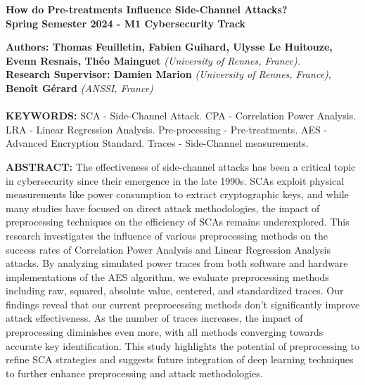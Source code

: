 \documentclass[a4paper,10pt]{article}
\begin{document}
\noindent 
\begin{center}
\textbf{{\Large How do Pre-treatments Influence Side-Channel Attacks?}} \\
\vspace{10pt}
\textbf{Spring Semester 2024 - M1 Cybersecurity Track}
\end{center}

\noindent 
\textbf{Authors: Thomas Feuilletin, Fabien Guihard, Ulysse Le Huitouze, Evenn Resnais, Théo Mainguet} \textit{(University of Rennes, France).}\\

\noindent 
\textbf{Research Supervisor: Damien Marion} \textit{(University of Rennes, France)}, \textbf{Benoît Gérard} \textit{(ANSSI, France)} \\
\\
\noindent 
\textbf{KEYWORDS:} SCA - Side-Channel Attack. CPA - Correlation Power Analysis. LRA - Linear Regression Analysis. Pre-processing - Pre-treatments. AES - Advanced Encryption Standard. Traces - Side-Channel measurements.

\begin{spacing}{0.82}
    \tableofcontents
\end{spacing}
\newpage

\noindent 
\textbf{ABSTRACT:} The effectiveness of side-channel attacks has been a critical topic in cybersecurity since their emergence in the late 1990s. 
SCAs exploit physical measurements like power consumption to extract cryptographic keys, and while many studies have focused on direct attack methodologies, the impact of preprocessing techniques on the efficiency of SCAs remains underexplored. 
This research investigates the influence of various preprocessing methods on the success rates of Correlation Power Analysis and Linear Regression Analysis attacks. By analyzing simulated power traces from both software and hardware implementations of the AES algorithm, we evaluate preprocessing methods including raw, squared, absolute value, centered, and standardized traces.
Our findings reveal that our current preprocessing methods don't significantly improve attack effectiveness. 
As the number of traces increases, the impact of preprocessing diminishes even more, with all methods converging towards accurate key identification. This study highlights the potential of preprocessing to refine SCA strategies and suggests future integration of deep learning techniques to further enhance preprocessing and attack methodologies.
\end{document}
